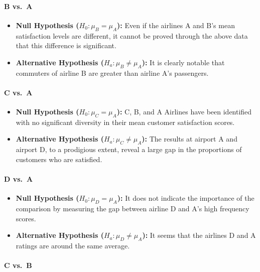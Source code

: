 \documentclass[
]{article}
\begin{document}
\paragraph{B vs.~A}\label{b-vs.-a}

\begin{itemize}
\item
  \textbf{Null Hypothesis (\(H_0: \mu_B = \mu_A\)):} Even if the
  airlines A and B's mean satisfaction levels are different, it cannot
  be proved through the above data that this difference is significant.
\item
  \textbf{Alternative Hypothesis (\(H_a: \mu_B \neq \mu_A\)):} It is
  clearly notable that commuters of airline B are greater than airline
  A's passengers.
\end{itemize}

\paragraph{C vs.~A}\label{c-vs.-a}

\begin{itemize}
\item
  \textbf{Null Hypothesis (\(H_0: \mu_C = \mu_A\)):} C, B, and A
  Airlines have been identified with no significant diversity in their
  mean customer satisfaction scores.
\item
  \textbf{Alternative Hypothesis (\(H_a: \mu_C \neq \mu_A\)):} The
  results at airport A and airport D, to a prodigious extent, reveal a
  large gap in the proportions of customers who are satisfied.
\end{itemize}

\paragraph{D vs.~A}\label{d-vs.-a}

\begin{itemize}
\item
  \textbf{Null Hypothesis (\(H_0: \mu_D = \mu_A\)):} It does not
  indicate the importance of the comparison by measuring the gap between
  airline D and A's high frequency scores.
\item
  \textbf{Alternative Hypothesis (\(H_a: \mu_D \neq \mu_A\)):} It seems
  that the airlines D and A ratings are around the same average.
\end{itemize}

\paragraph{C vs.~B}\label{c-vs.-b}
\end{document}
